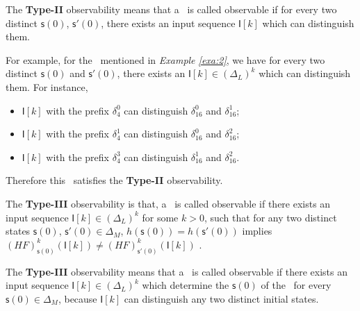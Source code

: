 The {\bf Type-II} observability means that a \BCN\ is called observable if for every two distinct $\mathsf{s}(0)$, $\mathsf{s}'(0)$, there exists an input sequence $\mathsf{I}[k]$ which can distinguish them. %
\begin{example}
For example, for the \BCN\ mentioned in {\em Example \ref{exa:2}}, we have for every two distinct $\mathsf{s}(0)$ and $\mathsf{s}'(0)$, there exists an $\mathsf{I}[k]\in(\Delta_L)^k$ which can distinguish them.  For instance,
\begin{itemize}
  \item $\mathsf{I}[k]$ with the prefix $\delta_{4}^0$ can distinguish $\delta_{16}^0$ and $\delta_{16}^1$;
  \item $\mathsf{I}[k]$ with the prefix $\delta_{4}^1$ can distinguish $\delta_{16}^0$ and $\delta_{16}^2$;
  \item $\mathsf{I}[k]$ with the prefix $\delta_{4}^3$ can distinguish $\delta_{16}^1$ and $\delta_{16}^2$.
\end{itemize} 
Therefore this \BCN\ satisfies the {\bf Type-II} observability.
\label{exa:5}
\end{example}   
\begin{definition}
The {\bf Type-III} observability is that, a \BCN\ is called observable if there exists an input sequence $\mathsf{I}[k]\in(\Delta_L)^k$ for some $k>0$, such that for any two distinct states $\mathsf{s}(0)$, $\mathsf{s}'(0) \in \Delta_M$, $h(\mathsf{s}(0))=h(\mathsf{s}'(0))$ implies $(HF)^k_{\mathsf{s}(0)}(\mathsf{I}[k])\neq (HF)^k_{\mathsf{s}'(0)}(\mathsf{I}[k])$ \cite{Cheng2011Identification}.
\end{definition}

The {\bf Type-III} observability means that a \BCN\ is called observable if there exists an input sequence $\mathsf{I}[k]\in(\Delta_L)^k$ which determine the $\mathsf{s}(0)$ of the \BCN\ for every $\mathsf{s}(0)\in\Delta_M$, because $\mathsf{I}[k]$ can distinguish any two distinct initial states.%

